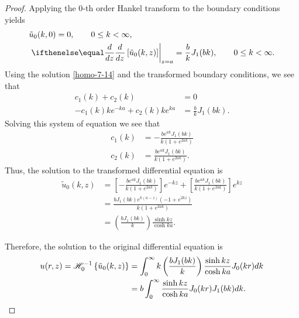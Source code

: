 \begin{proof}
  Applying the 0-th order Hankel transform to the boundary conditions yields
  \begin{align*}
    &\tilde{u}_0(k, 0) = 0, \qquad 0 \leq k < \infty, \\
    &\left.\der{z}{}\left[\tilde{u}_0(k, z)\right]\right\rvert_{z=a} = \frac{b}{k}J_1(bk), \qquad 0 \leq k < \infty.
  \end{align*}
  Using the solution \eqref{homo-7-14} and the transformed boundary conditions,
  we see that
  \begin{align*}
    c_1(k) + c_2(k) &= 0 \\
    -c_1(k) k e^{-ka}+ c_2(k) k e^{ka} &= \frac{b}{k}J_1(bk).
  \end{align*}
  Solving this system of equation we see that
  \begin{align*}
    c_1(k) &= -\frac{b e^{a k }J_1(b k )}{k\left(1 + e^{2 ak }\right)}\\
    c_2(k) &= \frac{b e^{a k }J_1(b k )}{k\left(1 + e^{2 ak }\right)}.
  \end{align*}
  Thus, the solution to the transformed differential equation is
  \begin{align*}
    \tilde{u}_0(k, z) &= \left[-\frac{b e^{a k }J_1(b k )}{k\left(1 + e^{2 ak }\right)} \right]e^{-kz}+ \left[\frac{b e^{a k }J_1(b k )}{k\left(1 + e^{2 ak }\right)}\right] e^{kz}\\
    &= \frac{b J_1(bk) e^{k(a-z)}\left(- 1 + e^{2 kz }\right)}{k \left(1 + e^{2 ak }\right)}\\
    &= \left(\frac{b J_1(bk)}{k}\right)\frac{\sinh k z}{\cosh ka}.
  \end{align*}

  Therefore, the solution to the original differential equation is
  \begin{align*}
    u(r, z) = \mathscr{H}^{-1}_{ {0} }\left\{ {\tilde{u}_0(k, z)} \right\} &= \int_0^\infty k \left(\frac{b J_1(bk)}{k}\right)\frac{\sinh k z}{\cosh ka} J_0(k r) dk \\
    &= b \int_0^\infty  \frac{\sinh k z}{\cosh ka} J_0(k r) J_1(bk)dk .
  \end{align*}
\end{proof}
\newpage
